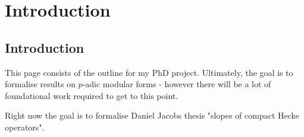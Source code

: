 \chapter{Introduction}

\section{Introduction}

This page consists of the outline for my PhD project. Ultimately, the goal is to formalise results
on $p$-adic modular forms - however there will be a lot of foundational work required to get to this
point.

Right now the goal is to formalise Daniel Jacobs thesis "slopes of compact Hecke operators".
